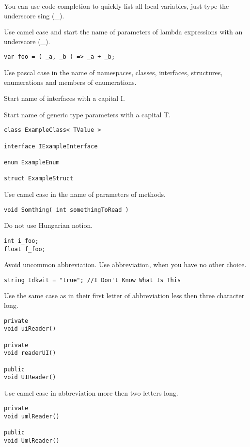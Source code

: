 \documentclass[11pt,a4paper]{book}
\begin{document}
\whymark You can use code completion to quickly list all local variables, just type the underscore sing (\_).

\domark Use camel case and start the name of parameters of lambda expressions with an underscore (\_).
\begin{verbatim}
var foo = ( _a, _b ) => _a + _b;
\end{verbatim}

\domark Use pascal case in the name of namespaces, classes, interfaces, structures, enumerations and members of enumerations.

\domark Start name of interfaces with a capital I.

\domark Start name of generic type parameters with a capital T.
\begin{verbatim}
class ExampleClass< TValue >

interface IExampleInterface

enum ExampleEnum

struct ExampleStruct
\end{verbatim}

\domark Use camel case in the name of parameters of methods.
\begin{verbatim}
void Somthing( int somethingToRead )
\end{verbatim}

\notmark Do not use Hungarian notion.
\begin{verbatim}
int i_foo;
float f_foo;
\end{verbatim}

\avoidmark Avoid uncommon abbreviation. Use abbreviation, when you have no other choice.
\begin{verbatim}
string Idkwit = "true"; //I Don't Know What Is This
\end{verbatim}

\domark Use the same case as in their first letter of abbreviation less then three character long.
\begin{verbatim}
private
void uiReader()

private
void readerUI()

public
void UIReader()
\end{verbatim}

\domark Use camel case in abbreviation more then two letters long.
\begin{verbatim}
private
void umlReader()

public
void UmlReader()
\end{verbatim}
\end{document}
